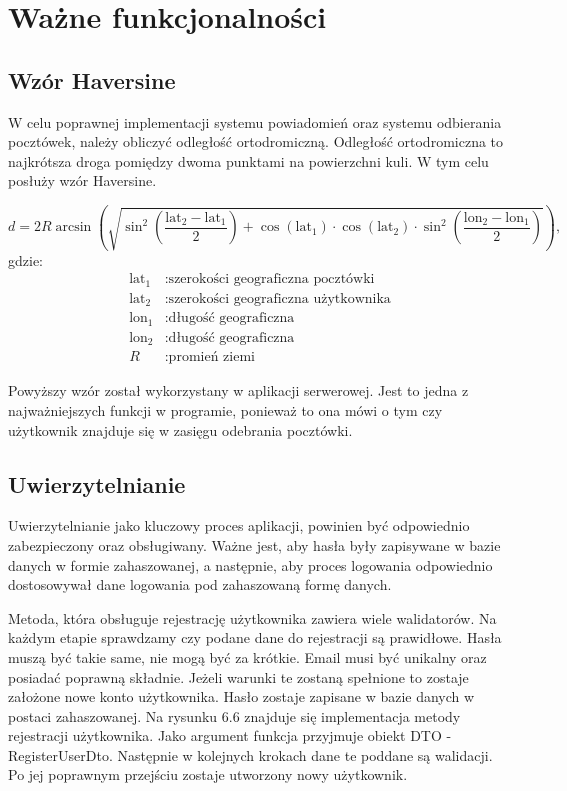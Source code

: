 \documentclass[a4paper,twoside,12pt]{book}
\begin{document}
\section{Ważne funkcjonalności}
\subsection{Wzór Haversine}
W celu poprawnej implementacji systemu powiadomień oraz systemu odbierania pocztówek, należy obliczyć odległość ortodromiczną. Odległość ortodromiczna to najkrótsza droga pomiędzy dwoma punktami na powierzchni kuli. W tym celu posłuży wzór Haversine.

    \begin{equation}
    d = 2R \arcsin\left( \sqrt{\sin^2\left(\frac{{\text{{lat}}_2 - \text{{lat}}_1}}{2}\right) + \cos(\text{{lat}}_1) \cdot \cos(\text{{lat}}_2) \cdot \sin^2\left(\frac{{\text{{lon}}_2 - \text{{lon}}_1}}{2}\right)} \right),
    \end{equation}
    gdzie:
    \begin{align*}
    \text{{lat}}_1 & : \text{{szerokości geograficzna pocztówki}} \\
    \text{{lat}}_2 & : \text{{szerokości geograficzna użytkownika}} \\
    \text{{lon}}_1 & : \text{{długość geograficzna}} \\
    \text{{lon}}_2 & : \text{{długość geograficzna}} \\
    R & : \text{{promień ziemi}}
    \end{align*}

Powyższy wzór został wykorzystany w aplikacji serwerowej. Jest to jedna z najważniejszych funkcji w programie, ponieważ to ona mówi o tym czy użytkownik znajduje się w zasięgu odebrania pocztówki.
    
\subsection{Uwierzytelnianie}
Uwierzytelnianie jako kluczowy proces aplikacji, powinien być odpowiednio zabezpieczony oraz obsługiwany. Ważne jest, aby hasła były zapisywane w bazie danych w formie zahaszowanej, a następnie, aby proces logowania odpowiednio dostosowywał dane logowania pod zahaszowaną formę danych.

Metoda, która obsługuje rejestrację użytkownika zawiera wiele walidatorów. Na każdym etapie sprawdzamy czy podane dane do rejestracji są prawidłowe. Hasła muszą być takie same, nie mogą być za krótkie. Email musi być unikalny oraz posiadać poprawną składnie. Jeżeli warunki te zostaną spełnione to zostaje założone nowe konto użytkownika. Hasło zostaje zapisane w bazie danych w postaci zahaszowanej. Na rysunku 6.6 znajduje się implementacja metody rejestracji użytkownika. Jako argument funkcja przyjmuje obiekt DTO - RegisterUserDto. Następnie w kolejnych krokach dane te poddane są walidacji. Po jej poprawnym przejściu zostaje utworzony nowy użytkownik.
\end{document}
